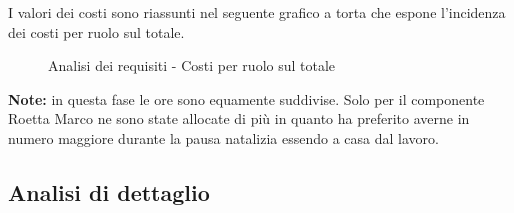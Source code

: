 			\noindent
			I valori dei costi sono riassunti nel seguente grafico a torta che espone l’incidenza dei costi per ruolo sul totale.
			\begin{center}
				\begin{figure}[htbp]
				\vspace{0.8cm}
				\caption{Analisi dei requisiti - Costi per ruolo sul totale}
				\end{figure}
			\end{center}
		\noindent
		\textbf{Note:} in questa fase le ore sono equamente suddivise. Solo per il componente Roetta Marco ne sono state allocate di più in quanto ha preferito averne in numero maggiore durante la pausa natalizia essendo a casa dal lavoro.
	\newpage
	\subsection{Analisi di dettaglio} %
	\label{sub:analisi_di_dettaglio}
